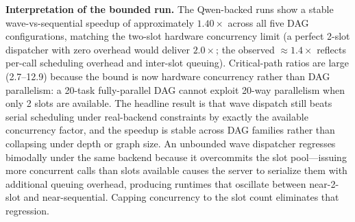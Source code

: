 \begin{table}[t]
\centering
\caption{Experiment 1 hardware-bounded replication. Mean of 10 runs per configuration, Qwen3.6-35B-A3B-APEX-Quality, 2 server slots, 256k KV cache each. Wave dispatch is capped at the slot count; the CP ratio is therefore dominated by hardware concurrency rather than DAG structure.}
\label{tab:dag-results-qwen}
\end{table}

\textbf{Interpretation of the bounded run.}
The Qwen-backed runs show a stable wave-vs-sequential speedup of approximately $1.40\times$ across all five DAG configurations, matching the two-slot hardware concurrency limit (a perfect 2-slot dispatcher with zero overhead would deliver $2.0\times$; the observed $\approx 1.4\times$ reflects per-call scheduling overhead and inter-slot queuing). Critical-path ratios are large (2.7--12.9) because the bound is now hardware concurrency rather than DAG parallelism: a 20-task fully-parallel DAG cannot exploit 20-way parallelism when only 2 slots are available. The headline result is that wave dispatch still beats serial scheduling under real-backend constraints by exactly the available concurrency factor, and the speedup is stable across DAG families rather than collapsing under depth or graph size. An unbounded wave dispatcher regresses bimodally under the same backend because it overcommits the slot pool---issuing more concurrent calls than slots available causes the server to serialize them with additional queuing overhead, producing runtimes that oscillate between near-2-slot and near-sequential. Capping concurrency to the slot count eliminates that regression.

